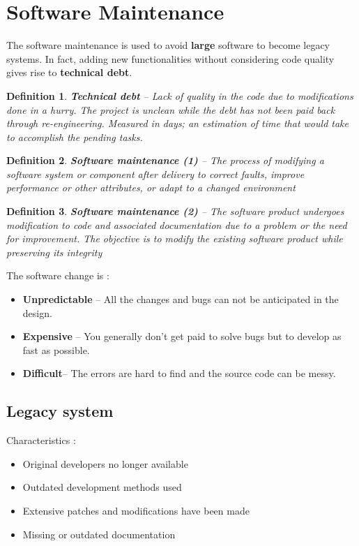 \documentclass[a4paper,11pt]{report}
\newtheorem{definition}{Definition}
\begin{document}
\section{Software Maintenance}\noindent
	The software maintenance is used
		to avoid \textbf{large} software to become 
		legacy systems. In fact, adding
		new functionalities without 
		considering code quality gives rise
		to \textbf{technical debt}.
	\begin{definition}
		\textbf{Technical debt} -- 
			Lack of quality in the code due to 
			modifications done in a hurry.
			The project is unclean while the debt
			has not been paid back through 
			re-engineering. Measured in days; 
			an estimation of time that would take
			to accomplish the pending tasks.
	\end{definition}
	\begin{definition}
		\textbf{Software maintenance (1)} -- 
			The process of modifying a software 
			system or component after delivery 
			to correct faults, improve 
			performance or other attributes, 
			or adapt to a changed environment
	\end{definition}
	\begin{definition}
		\textbf{Software maintenance (2)} -- 
			The software product undergoes 
			modification to code and associated 
			documentation due to a problem or
			the need for improvement. 
			The objective is to modify
			the existing software product 
			while preserving its integrity
	\end{definition}\noindent
	The software change is :
	\begin{itemize}
		\setlength{\itemsep}{0pt}		
		\setlength{\parskip}{0pt}		
		\setlength{\parsep}{0pt}	
		\item \textbf{Unpredictable} --
			All the changes and bugs can not be
			anticipated in the design.
		\item \textbf{Expensive} --
			You generally don't get paid to solve bugs but
			to develop as fast as possible.
		\item \textbf{Difficult}-- The errors are hard
			to find and the source code can be messy.
	\end{itemize}
	\subsection{Legacy system}
		Characteristics : 
		\begin{itemize}
			\setlength{\itemsep}{0pt}		
			\setlength{\parskip}{0pt}		
			\setlength{\parsep}{0pt}	
			\item Original developers no longer
				available
			\item Outdated development methods
				used
			\item Extensive patches and modifications 
				have been made
			\item Missing or outdated documentation
		\end{itemize}
\end{document}
